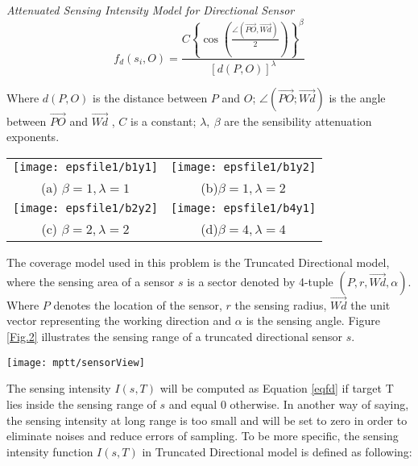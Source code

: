 \documentclass[final]{elsarticle}
\begin{document}
\textit{Attenuated Sensing Intensity Model for Directional Sensor}\\
\begin{equation}
\label{eqfd}
f_d({s_i},O) = \frac{{C{{\left\{ {\cos \left( {\frac{{\angle (\overrightarrow {PO} ,\overrightarrow {Wd}) }}{2}} \right)} \right\}}^\beta }}}{{{{\left[ {d(P,O)} \right]}^\lambda }}}
\end{equation}

Where $ d(P, O) $ is the distance between $ P $ and $ O $; $ \angle (\overrightarrow {PO}; \overrightarrow {Wd})$ is the angle between $ \overrightarrow {PO} $ and $ \overrightarrow {Wd}$ , $C$ is a constant; $ \lambda,\ \beta $ are the sensibility attenuation exponents. 
\begin{figure*}[h]
	\begin{tabular}{cc}
		\texttt{[image: epsfile1/b1y1]}&\texttt{[image: epsfile1/b1y2]}\\
		(a) $\beta =1, \lambda=1 $ &(b)$ \beta=1, \lambda=2 $\\
		\texttt{[image: epsfile1/b2y2]}&\texttt{[image: epsfile1/b4y1]}\\
		(c) $ \beta=2, \lambda=2 $& (d)$ \beta=4, \lambda=4 $\\
	\end{tabular}
	\centering
	\caption{Illustration attenuated directional sensing model with different $ \beta's $ and $ \lambda's $
	}
	\label{Fig.1}       %
\end{figure*}
The coverage model used in this problem is the Truncated Directional model, where the sensing area of a sensor $ s $ is a sector denoted by 4-tuple $( P, r, \overrightarrow{Wd}, \alpha )$. Where $ P $ denotes the location of the sensor, $ r $ the sensing radius, $ \overrightarrow{Wd}$ the unit vector representing the working direction and $ \alpha $ is the sensing angle. Figure \ref{Fig.2} illustrates the sensing range of a truncated directional sensor $ s $. 

\begin{figure*}[h]
	\centering
	\texttt{[image: mptt/sensorView]}
	\caption{Sensing capability of directional sensor}
	\label{Fig.2}       %
\end{figure*}
The sensing intensity $I(s,T)$ will be computed as Equation \ref{eqfd} if target T lies inside the sensing range of $s$ and equal 0 otherwise. In another way of saying, the sensing intensity at long range is too small and will be set to zero in order to eliminate noises and reduce errors of sampling. To be more specific, the sensing intensity function $I(s,T)$ in Truncated Directional model is defined as following:
\end{document}

